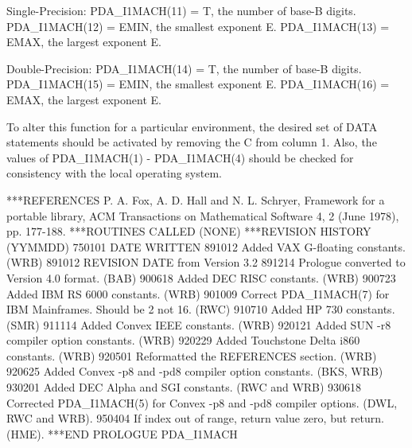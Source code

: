 \documentclass[11pt,twoside,nolof]{starlink}
\begin{document}
\begin{terminalv}
   Single-Precision:
     PDA_I1MACH(11) = T, the number of base-B digits.
     PDA_I1MACH(12) = EMIN, the smallest exponent E.
     PDA_I1MACH(13) = EMAX, the largest exponent E.

   Double-Precision:
     PDA_I1MACH(14) = T, the number of base-B digits.
     PDA_I1MACH(15) = EMIN, the smallest exponent E.
     PDA_I1MACH(16) = EMAX, the largest exponent E.

   To alter this function for a particular environment, the desired
   set of DATA statements should be activated by removing the C from
   column 1.  Also, the values of PDA_I1MACH(1) - PDA_I1MACH(4) should be
   checked for consistency with the local operating system.

***REFERENCES  P. A. Fox, A. D. Hall and N. L. Schryer, Framework for
                 a portable library, ACM Transactions on Mathematical
                 Software 4, 2 (June 1978), pp. 177-188.
***ROUTINES CALLED  (NONE)
***REVISION HISTORY  (YYMMDD)
   750101  DATE WRITTEN
   891012  Added VAX G-floating constants.  (WRB)
   891012  REVISION DATE from Version 3.2
   891214  Prologue converted to Version 4.0 format.  (BAB)
   900618  Added DEC RISC constants.  (WRB)
   900723  Added IBM RS 6000 constants.  (WRB)
   901009  Correct PDA_I1MACH(7) for IBM Mainframes. Should be 2 not 16.
           (RWC)
   910710  Added HP 730 constants.  (SMR)
   911114  Added Convex IEEE constants.  (WRB)
   920121  Added SUN -r8 compiler option constants.  (WRB)
   920229  Added Touchstone Delta i860 constants.  (WRB)
   920501  Reformatted the REFERENCES section.  (WRB)
   920625  Added Convex -p8 and -pd8 compiler option constants.
           (BKS, WRB)
   930201  Added DEC Alpha and SGI constants.  (RWC and WRB)
   930618  Corrected PDA_I1MACH(5) for Convex -p8 and -pd8 compiler
           options.  (DWL, RWC and WRB).
   950404  If index out of range, return value zero, but return.
           (HME).
***END PROLOGUE  PDA_I1MACH
\end{terminalv}

\end{document}
